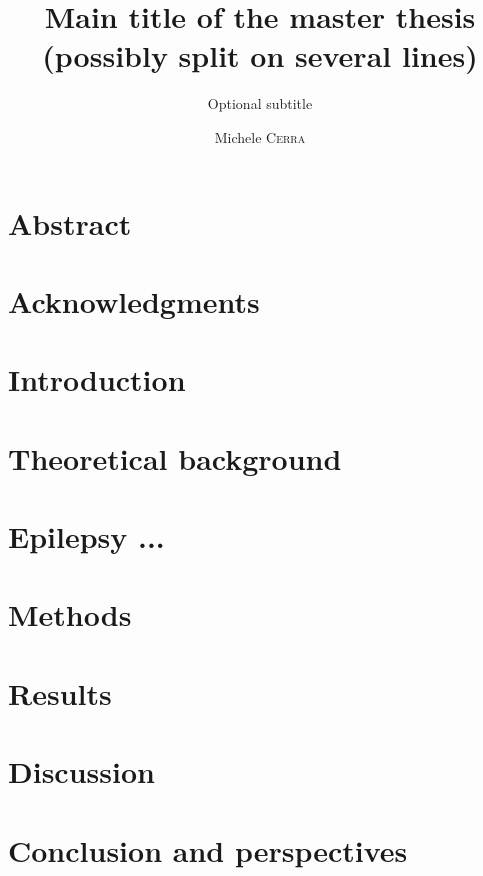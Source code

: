 \documentclass{EPL-master-thesis-covers-EN}
\title{Main title of the master thesis (possibly split on several lines)}
\subtitle{Optional subtitle}
\author{Michele \textsc{Cerra}}
\begin{document}
  \maketitle
  \frontmatter %

  \chapter*{Abstract}
  
  \chapter*{Acknowledgments}

  \tableofcontents

  \mainmatter %
  \chapter*{Introduction}
  

  \chapter{Theoretical background}

  \chapter{Epilepsy ...}

  \chapter{Methods}

  \chapter{Results}

  \chapter{Discussion}

  \chapter*{Conclusion and perspectives}

  \backcoverpage
\end{document}
